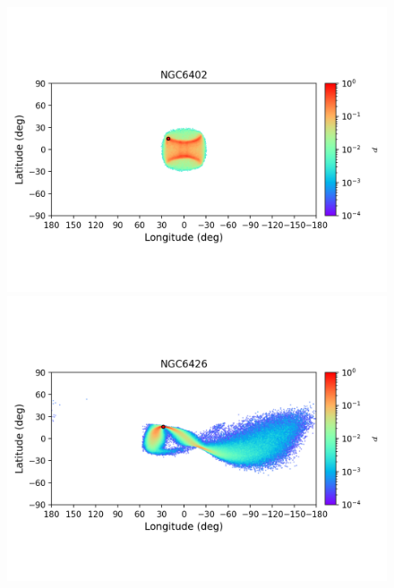\begin{figure}
\begin{center}
                \includegraphics[clip=true, trim = 0mm 20mm 0mm 10mm, width=1\columnwidth]{images/error_plots_NGC6402.png}
                \includegraphics[clip=true, trim = 0mm 20mm 0mm 10mm, width=1\columnwidth]{images/error_plots_NGC6426.png}
                

\end{center}
\end{figure}
